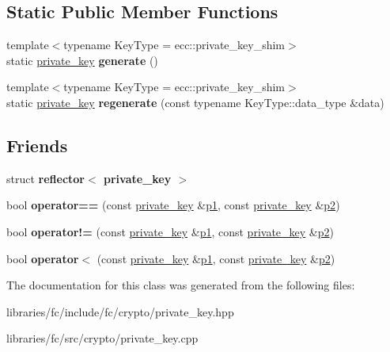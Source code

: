 \subsection*{Static Public Member Functions}
\begin{DoxyCompactItemize}
\item 
\mbox{\label{classfc_1_1crypto_1_1private__key_a54177eb6dda9421bb6e9661478f29807}} 
{\footnotesize template$<$typename Key\+Type  = ecc\+::private\+\_\+key\+\_\+shim$>$ }\\static \mbox{\hyperlink{classfc_1_1crypto_1_1private__key}{private\+\_\+key}} {\bfseries generate} ()
\item 
\mbox{\label{classfc_1_1crypto_1_1private__key_a89f09f5b110de0d285808f12fa8d0af2}} 
{\footnotesize template$<$typename Key\+Type  = ecc\+::private\+\_\+key\+\_\+shim$>$ }\\static \mbox{\hyperlink{classfc_1_1crypto_1_1private__key}{private\+\_\+key}} {\bfseries regenerate} (const typename Key\+Type\+::data\+\_\+type \&data)
\end{DoxyCompactItemize}
\subsection*{Friends}
\begin{DoxyCompactItemize}
\item 
\mbox{\label{classfc_1_1crypto_1_1private__key_a0d73ef2ad8ea279f8546de470c1cf28f}} 
struct {\bfseries reflector$<$ private\+\_\+key $>$}
\item 
\mbox{\label{classfc_1_1crypto_1_1private__key_a4e5a99f7c4a4afa9d08c0fd8ac0ef2ef}} 
bool {\bfseries operator==} (const \mbox{\hyperlink{classfc_1_1crypto_1_1private__key}{private\+\_\+key}} \&\mbox{\hyperlink{classp1}{p1}}, const \mbox{\hyperlink{classfc_1_1crypto_1_1private__key}{private\+\_\+key}} \&\mbox{\hyperlink{classp2}{p2}})
\item 
\mbox{\label{classfc_1_1crypto_1_1private__key_acbc24910ec1f4cec7a24f442b4fd9768}} 
bool {\bfseries operator!=} (const \mbox{\hyperlink{classfc_1_1crypto_1_1private__key}{private\+\_\+key}} \&\mbox{\hyperlink{classp1}{p1}}, const \mbox{\hyperlink{classfc_1_1crypto_1_1private__key}{private\+\_\+key}} \&\mbox{\hyperlink{classp2}{p2}})
\item 
\mbox{\label{classfc_1_1crypto_1_1private__key_addc04110bb10f581d48f3eaf55fe2341}} 
bool {\bfseries operator$<$} (const \mbox{\hyperlink{classfc_1_1crypto_1_1private__key}{private\+\_\+key}} \&\mbox{\hyperlink{classp1}{p1}}, const \mbox{\hyperlink{classfc_1_1crypto_1_1private__key}{private\+\_\+key}} \&\mbox{\hyperlink{classp2}{p2}})
\end{DoxyCompactItemize}


The documentation for this class was generated from the following files\+:\begin{DoxyCompactItemize}
\item 
libraries/fc/include/fc/crypto/private\+\_\+key.\+hpp\item 
libraries/fc/src/crypto/private\+\_\+key.\+cpp\end{DoxyCompactItemize}
